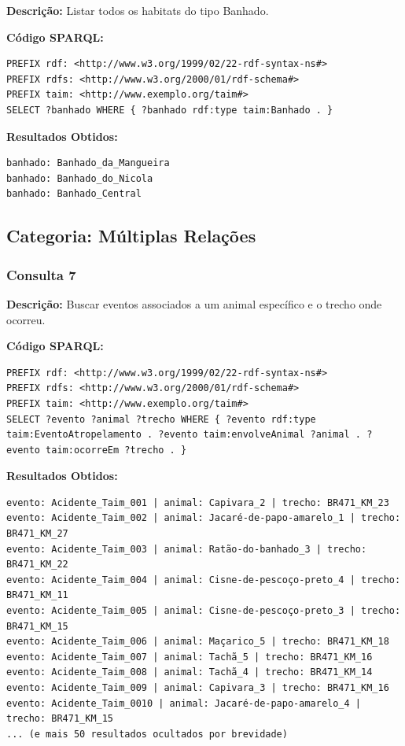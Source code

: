 \documentclass[12pt,a4paper]{article}
\begin{document}
\textbf{Descrição:} Listar todos os habitats do tipo Banhado.

\textbf{Código SPARQL:}
\begin{lstlisting}
PREFIX rdf: <http://www.w3.org/1999/02/22-rdf-syntax-ns#>
PREFIX rdfs: <http://www.w3.org/2000/01/rdf-schema#>
PREFIX taim: <http://www.exemplo.org/taim#>
SELECT ?banhado WHERE { ?banhado rdf:type taim:Banhado . }
\end{lstlisting}

\textbf{Resultados Obtidos:}
\begin{lstlisting}
banhado: Banhado_da_Mangueira
banhado: Banhado_do_Nicola
banhado: Banhado_Central
\end{lstlisting}

\vspace{1cm}
\subsection*{Categoria: Múltiplas Relações}

\subsubsection*{Consulta 7}

\textbf{Descrição:} Buscar eventos associados a um animal específico e o trecho onde ocorreu.

\textbf{Código SPARQL:}
\begin{lstlisting}
PREFIX rdf: <http://www.w3.org/1999/02/22-rdf-syntax-ns#>
PREFIX rdfs: <http://www.w3.org/2000/01/rdf-schema#>
PREFIX taim: <http://www.exemplo.org/taim#>
SELECT ?evento ?animal ?trecho WHERE { ?evento rdf:type taim:EventoAtropelamento . ?evento taim:envolveAnimal ?animal . ?evento taim:ocorreEm ?trecho . }
\end{lstlisting}

\textbf{Resultados Obtidos:}
\begin{lstlisting}
evento: Acidente_Taim_001 | animal: Capivara_2 | trecho: BR471_KM_23
evento: Acidente_Taim_002 | animal: Jacaré-de-papo-amarelo_1 | trecho: BR471_KM_27
evento: Acidente_Taim_003 | animal: Ratão-do-banhado_3 | trecho: BR471_KM_22
evento: Acidente_Taim_004 | animal: Cisne-de-pescoço-preto_4 | trecho: BR471_KM_11
evento: Acidente_Taim_005 | animal: Cisne-de-pescoço-preto_3 | trecho: BR471_KM_15
evento: Acidente_Taim_006 | animal: Maçarico_5 | trecho: BR471_KM_18
evento: Acidente_Taim_007 | animal: Tachã_5 | trecho: BR471_KM_16
evento: Acidente_Taim_008 | animal: Tachã_4 | trecho: BR471_KM_14
evento: Acidente_Taim_009 | animal: Capivara_3 | trecho: BR471_KM_16
evento: Acidente_Taim_0010 | animal: Jacaré-de-papo-amarelo_4 | trecho: BR471_KM_15
... (e mais 50 resultados ocultados por brevidade)
\end{lstlisting}
\end{document}
